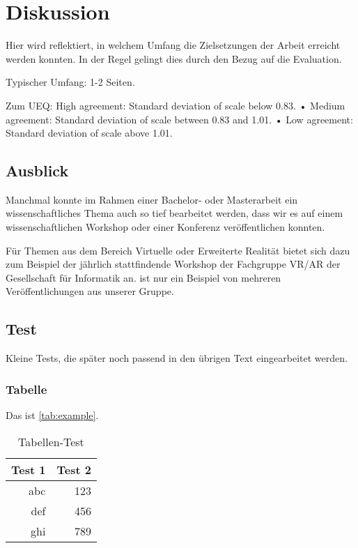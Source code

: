 \chapter{Diskussion}

Hier wird reflektiert, in welchem Umfang die Zielsetzungen der Arbeit erreicht werden konnten. In der Regel gelingt dies durch den Bezug auf die Evaluation.

Typischer Umfang: 1-2 Seiten.

Zum UEQ: High agreement: Standard deviation of scale below 0.83.
• Medium agreement: Standard deviation of scale between 0.83 and 1.01.
• Low agreement: Standard deviation of scale above 1.01.

\section{Ausblick}

Manchmal konnte im Rahmen einer Bachelor- oder Masterarbeit ein
wissenschaftliches Thema auch so tief bearbeitet werden, dass wir es auf einem
wissenschaftlichen Workshop oder einer Konferenz veröffentlichen konnten.

Für Themen aus dem Bereich Virtuelle oder Erweiterte Realität bietet sich dazu
zum Beispiel der jährlich stattfindende Workshop der Fachgruppe VR/AR der
Gesellschaft für Informatik an. \citet{Bluhm:Sonar:2009} ist nur ein Beispiel
von mehreren Veröffentlichungen aus unserer Gruppe.

\section{Test}
Kleine Tests, die später noch passend in den übrigen Text eingearbeitet werden.

\subsection{Tabelle}

Das ist \autoref{tab:example}.

\begin{table}[tbh]
 \centering
 \begin{tabular}{r|r}
 Test 1 & Test 2\\
 \hline
 abc & 123\\
 def & 456\\
 ghi & 789
 \end{tabular}
 \caption{Tabellen-Test}
 \label{tab:example}
\end{table}

